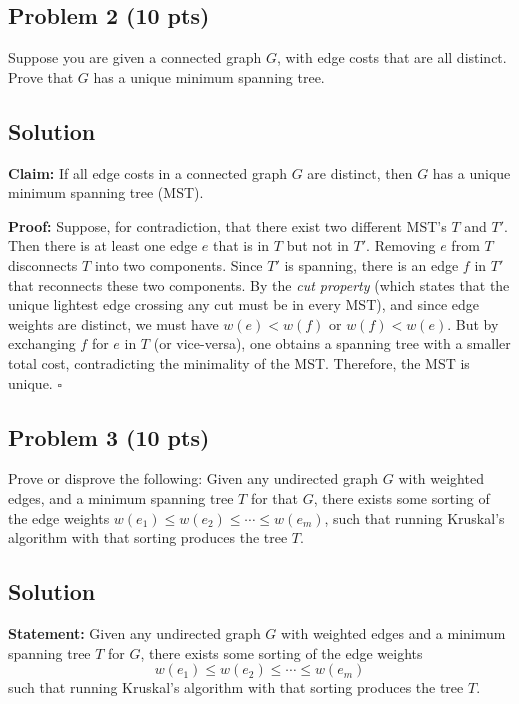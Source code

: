 \documentclass[12pt]{article}
\begin{document}
\bigskip

\subsection*{Problem 2 (10 pts)}
Suppose you are given a connected graph $G$, with edge costs that are all distinct. Prove that $G$ has a unique minimum spanning tree.

\subsection*{Solution}
\textbf{Claim:} If all edge costs in a connected graph \(G\) are distinct, then \(G\) has a unique minimum spanning tree (MST).

\textbf{Proof:} Suppose, for contradiction, that there exist two different MST's \(T\) and \(T'\). Then there is at least one edge \(e\) that is in \(T\) but not in \(T'\). Removing \(e\) from \(T\) disconnects \(T\) into two components. Since \(T'\) is spanning, there is an edge \(f\) in \(T'\) that reconnects these two components. By the \emph{cut property} (which states that the unique lightest edge crossing any cut must be in every MST), and since edge weights are distinct, we must have \(w(e) < w(f)\) or \(w(f) < w(e)\). But by exchanging \(f\) for \(e\) in \(T\) (or vice-versa), one obtains a spanning tree with a smaller total cost, contradicting the minimality of the MST. Therefore, the MST is unique. \(\square\)

\bigskip

\subsection*{Problem 3 (10 pts)}
Prove or disprove the following: Given any undirected graph $G$ with weighted edges, and a minimum spanning tree $T$ for that $G$, there exists some sorting of the edge weights $w(e_1) \le  w(e_2) \le \cdots \le w(e_m)$, such that running Kruskal's algorithm with that sorting produces the tree $T$.\\

\subsection*{Solution}
\textbf{Statement:} Given any undirected graph \(G\) with weighted edges and a minimum spanning tree \(T\) for \(G\), there exists some sorting of the edge weights 
\[
w(e_1) \le w(e_2) \le \cdots \le w(e_m)
\]
such that running Kruskal's algorithm with that sorting produces the tree \(T\).
\end{document}
